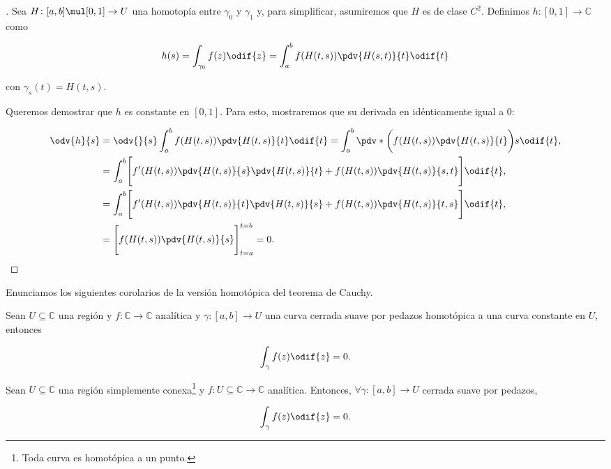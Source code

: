 \documentclass[../main.tex]{subfiles}
\begin{document}
\begin{proof}[]
    Sea \(H \colon [a, b] \mul [0, 1] \to U\) una homotopía entre \(\gamma_{0}\) y
    \(\gamma_{1}\) y, para simplificar, asumiremos que \(H\) es de clase \(C^{2}\).
    Definimos \(h \colon [0, 1] \to \mathbb{C}\) como

    \begin{equation*}
        h(s) = \int_{\gamma_{0}}^{}f(z)\odif{z} = \int_{a}^{b}f(H(t, s))\pdv{H(s,
        t)}{t}\odif{t}
    \end{equation*}

    con \(\gamma_{s}(t) = H(t, s)\).

    Queremos demostrar que \(h\) es constante en \([0, 1]\). Para esto, mostraremos que
    su derivada en idénticamente igual a 0:

    \begin{align*}
        \odv{h}{s} &= \odv{}{s}\int_{a}^{b}f(H(t, s))\pdv{H(t, s)}{t}\odif{t} =
        \int_{a}^{b}\pdv*{\biggl(f(H(t, s))\pdv{H(t, s)}{t}\biggr)}{s}\odif{t},\\
        &= \int_{a}^{b}\Biggl[f^{\prime}(H(t, s))\pdv{H(t, s)}{s}\pdv{H(t, s)}{t} +
        f(H(t, s))\pdv{H(t, s)}{s, t}\Biggr]\odif{t},\\
        &= \int_{a}^{b}\Biggl[f^{\prime}(H(t, s))\pdv{H(t, s)}{t}\pdv{H(t, s)}{s} +
        f(H(t, s))\pdv{H(t, s)}{t,s}\Biggr]\odif{t},\\
        &= \Biggl[f(H(t, s))\pdv{H(t, s)}{s}\Biggr]_{t = a}^{t = b} = 0.
    \end{align*}
\end{proof}


Enunciamos los siguientes corolarios de la versión homotópica del teorema de Cauchy.

\begin{corollary}
    Sean \(U \subseteq \mathbb{C}\) una región y \(f \colon \mathbb{C} \to \mathbb{C}\)
    analítica y \(\gamma \colon [a, b] \to U\) una curva cerrada suave por pedazos
    homotópica a una curva constante en \(U\), entonces

    \begin{equation*}
        \int_{\gamma}^{}f(z)\odif{z} = 0.
    \end{equation*}
\end{corollary}

\begin{corollary}
    Sean \(U \subseteq \mathbb{C}\) una región simplemente conexa\footnote{Toda curva es
    homotópica a un punto.} y \(f \colon  U  \subseteq \mathbb{C} \to \mathbb{C}\)
    analítica. Entonces, \( \forall \gamma\colon [a, b] \to U\) cerrada suave
    por pedazos,

    \begin{equation}
        \int_{\gamma}^{}f(z)\odif{z} = 0.
    \end{equation}
\end{corollary}
\end{document}
